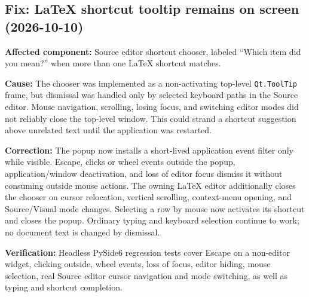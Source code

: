 \documentclass[a4paper]{article}
\title{}
\date{}
\author{Mohammad Rahmani}
\begin{document}
   \maketitle

   \begin{preview}
\section*{Fix: LaTeX shortcut tooltip remains on screen (2026-10-10)}
\textbf{Affected component:} Source editor shortcut chooser, labeled
``Which item did you mean?'' when more than one LaTeX shortcut matches.

\textbf{Cause:} The chooser was implemented as a non-activating top-level
\texttt{Qt.ToolTip} frame, but dismissal was handled only by selected
keyboard paths in the Source editor. Mouse navigation, scrolling, losing
focus, and switching editor modes did not reliably close the top-level
window. This could strand a shortcut suggestion above unrelated text until
the application was restarted.

\textbf{Correction:} The popup now installs a short-lived application event
filter only while visible. Escape, clicks or wheel events outside the popup,
application/window deactivation, and loss of editor focus dismiss it without
consuming outside mouse actions. The owning LaTeX editor additionally
closes the chooser on cursor relocation, vertical scrolling, context-menu
opening, and Source/Visual mode changes. Selecting a row by mouse now
activates its shortcut and closes the popup. Ordinary typing and keyboard
selection continue to work; no document text is changed by dismissal.

\textbf{Verification:} Headless PySide6 regression tests cover Escape on a
non-editor widget, clicking outside, wheel events, loss of focus, editor
hiding, mouse selection, real Source editor cursor navigation and mode
switching, as well as typing and shortcut completion.

   \end{preview}

   
   
\end{document}
